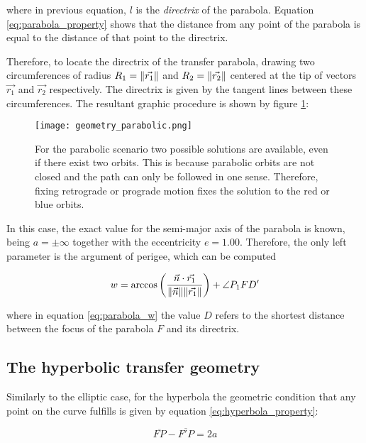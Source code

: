 where in previous equation, $l$ is the \textit{directrix} of the parabola.
Equation \ref{eq:parabola_property} shows that the distance from any point of
the parabola is equal to the distance of that point to the directrix.

Therefore, to locate the directrix of the transfer parabola, drawing two
circumferences of radius $R_{1} = \lVert\vec{r_{1}}\rVert$ and
$R_{2}=\lVert\vec{r_{2}}\rVert$ centered at the tip of vectors $\vec{r_{1}}$ and
$\vec{r_{2}}$ respectively. The directrix is given by the tangent lines between
these circumferences. The resultant graphic procedure is shown by figure
\ref{fig:parabolic_geometry}:

\begin{figure}[H]
  \centering
  \texttt{[image: geometry\_parabolic.png]}
  \caption[Parabolic transfer geometry.]{ For the parabolic scenario two possible solutions are available,
    even if there exist two orbits. This is because parabolic orbits are
    not closed and the path can only be followed in one sense. Therefore,
    fixing retrograde or prograde motion fixes the solution to the red or
    blue orbits.
  }
  \label{fig:parabolic_geometry}
\end{figure}

In this case, the exact value for the semi-major axis of the parabola is known,
being $a = \pm \infty$ together with the eccentricity $e=1.00$. Therefore, the
only left parameter is the argument of perigee, which can be computed

\begin{equation}
  w = \arccos{\left(\frac{\vec{n} \cdot \vec{r_{1}}}{\lVert\vec{n}\rVert
      \lVert\vec{r_{1}}\rVert} \right) + \angle P_{1}FD'}
  \label{eq:parabola_w}
\end{equation}

where in equation \ref{eq:parabola_w} the value $D$ refers to the shortest
distance between the focus of the parabola $F$ and its directrix.

\subsection{The hyperbolic transfer geometry}

Similarly to the elliptic case, for the hyperbola the geometric condition that
any point on the curve fulfills is given by equation
\ref{eq:hyperbola_property}:

\begin{equation}
  \overline{FP} - \overline{F'P} = 2a
  \label{eq:hyperbola_property}
\end{equation}

